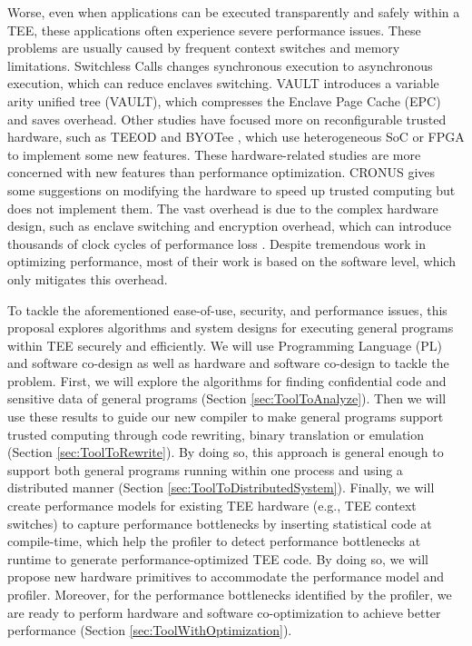 Worse, even when applications can be executed transparently and safely within a TEE,
these applications often experience severe performance issues.
These problems are usually caused by frequent context switches and memory limitations.
Switchless Calls \cite{Tian2018SwitchlessCM} changes synchronous execution
to asynchronous execution, which can reduce enclaves switching.
VAULT \cite{Taassori2018VAULTRP} introduces a variable arity unified tree (VAULT),
which compresses the Enclave Page Cache (EPC) and saves overhead.
Other studies have focused more on reconfigurable trusted hardware,
such as TEEOD \cite{Pereira2021TowardsAT} and BYOTee \cite{Armanuzzaman2022BYOTeeTB},
which use heterogeneous SoC or FPGA to implement some new features.
These hardware-related studies are more concerned with new features than
performance optimization. CRONUS \cite{Jiang2022CRONUSFS} gives some suggestions
on modifying the hardware to speed up trusted computing but does not
implement them.
The vast overhead is due to the complex hardware design, such as enclave switching
and encryption overhead, which can introduce thousands of clock cycles of performance
loss \cite{Weichbrodt2018sgxperfAP}. 
Despite tremendous work in optimizing performance, most of their work is based on the
software level, which only mitigates this overhead.

To tackle the aforementioned ease-of-use, security, and performance issues, this proposal explores
algorithms and system designs for executing general programs within TEE securely and efficiently.
We will use Programming Language (PL) and software co-design as well as hardware and software co-design
to tackle the problem.
First, we will explore the algorithms for finding confidential code and sensitive data of
general programs (Section \ref{sec:ToolToAnalyze}). Then we will use these results
to guide our new compiler to make general programs support trusted computing through
code rewriting, binary translation or emulation (Section \ref{sec:ToolToRewrite}).
By doing so, this approach is general enough to support both general programs running within
one process and using a distributed manner (Section \ref{sec:ToolToDistributedSystem}).
Finally, we will create performance models for existing TEE hardware (e.g., TEE context switches)
to capture performance bottlenecks by inserting statistical code at compile-time,
which help the profiler to detect performance bottlenecks at runtime to generate
performance-optimized TEE code. By doing so, we will propose new hardware primitives
to accommodate the performance model and profiler.
Moreover, for the performance bottlenecks identified by the profiler, we are ready to
perform hardware and software co-optimization to achieve better performance
(Section \ref{sec:ToolWithOptimization}).
